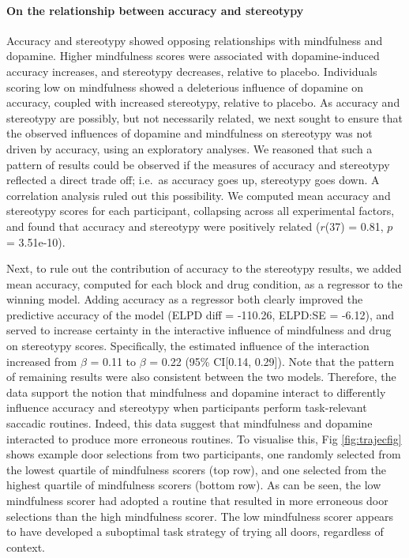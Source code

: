 \documentclass{article}
\begin{document}
\hypertarget{on-the-relationship-between-accuracy-and-stereotypy}{%
\paragraph{On the relationship between accuracy and
stereotypy}\label{on-the-relationship-between-accuracy-and-stereotypy}}

Accuracy and stereotypy showed opposing relationships with mindfulness
and dopamine. Higher mindfulness scores were associated with
dopamine-induced accuracy increases, and stereotypy decreases, relative
to placebo. Individuals scoring low on mindfulness showed a deleterious
influence of dopamine on accuracy, coupled with increased stereotypy,
relative to placebo. As accuracy and stereotypy are possibly, but not
necessarily related, we next sought to ensure that the observed
influences of dopamine and mindfulness on stereotypy was not driven by
accuracy, using an exploratory analyses. We reasoned that such a pattern
of results could be observed if the measures of accuracy and stereotypy
reflected a direct trade off; i.e.~as accuracy goes up, stereotypy goes
down. A correlation analysis ruled out this possibility. We computed
mean accuracy and stereotypy scores for each participant, collapsing
across all experimental factors, and found that accuracy and stereotypy
were positively related (\(r\)(37) = 0.81, \(p\) = 3.51e-10).

Next, to rule out the contribution of accuracy to the stereotypy
results, we added mean accuracy, computed for each block and drug
condition, as a regressor to the winning model. Adding accuracy as a
regressor both clearly improved the predictive accuracy of the model
(ELPD diff = -110.26, ELPD:SE = -6.12), and served to increase certainty
in the interactive influence of mindfulness and drug on stereotypy
scores. Specifically, the estimated influence of the interaction
increased from \(\beta\) = 0.11 to \(\beta\) = 0.22 (95\% CI{[}0.14,
0.29{]}). Note that the pattern of remaining results were also
consistent between the two models. Therefore, the data support the
notion that mindfulness and dopamine interact to differently influence
accuracy and stereotypy when participants perform task-relevant saccadic
routines. Indeed, this data suggest that mindfulness and dopamine
interacted to produce more erroneous routines. To visualise this, Fig
\ref{fig:trajecfig} shows example door selections from two participants,
one randomly selected from the lowest quartile of mindfulness scorers
(top row), and one selected from the highest quartile of mindfulness
scorers (bottom row). As can be seen, the low mindfulness scorer had
adopted a routine that resulted in more erroneous door selections than
the high mindfulness scorer. The low mindfulness scorer appears to have
developed a suboptimal task strategy of trying all doors, regardless of
context.
\end{document}

